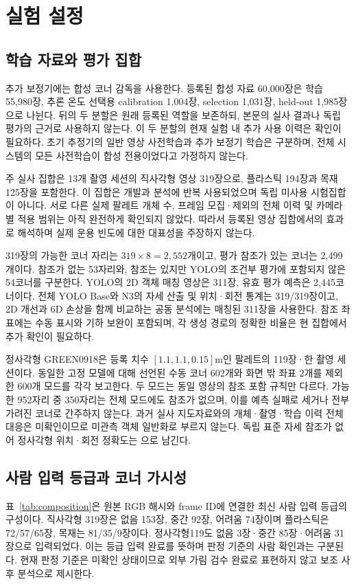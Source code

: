 \section{실험 설정}\label{sec:setup}
\subsection{학습 자료와 평가 집합}
추가 보정기에는 합성 코너 감독을 사용한다. 등록된 합성 자료 60,000장은 학습 55,980장, 추론 온도 선택용 calibration 1,004장, selection 1,031장, held-out 1,985장으로 나뉜다. 뒤의 두 분할은 원래 등록된 역할을 보존하되, 본문의 실사 결과나 독립 평가의 근거로 사용하지 않는다. 이 두 분할의 현재 실험 내 추가 사용 이력은 확인이 필요하다. 초기 추정기의 일반 영상 사전학습과 추가 보정기 학습은 구분하며, 전체 시스템의 모든 사전학습이 합성 전용이었다고 가정하지 않는다.

주 실사 집합은 13개 촬영 세션의 직사각형 영상 319장으로, 플라스틱 194장과 목재 125장을 포함한다. 이 집합은 개발과 분석에 반복 사용되었으며 독립 미사용 시험집합이 아니다. 서로 다른 실제 팔레트 개체 수, 프레임 모집·제외의 전체 이력 및 카메라별 적용 범위는 아직 완전하게 확인되지 않았다. 따라서 등록된 영상 집합에서의 효과로 해석하며 실제 운용 빈도에 대한 대표성을 주장하지 않는다.

319장의 가능한 코너 자리는 $319\times8=2,552$개이고, 평가 참조가 있는 코너는 2,499개이다. 참조가 없는 53자리와, 참조는 있지만 YOLO의 조건부 평가에 포함되지 않은 54코너를 구분한다. YOLO의 2D 객체 매칭 영상은 311장, 유효 평가 예측은 2,445코너이다. 전체 YOLO Base와 N3의 자세 산출 및 위치·회전 통계는 319/319장이고, 2D 개선과 6D 손상을 함께 비교하는 공동 분석에는 매칭된 311장을 사용한다. 참조 좌표에는 수동 표시와 기하 보완이 포함되며, 각 생성 경로의 정확한 비율은 현 집합에서 추가 확인이 필요하다.

정사각형 GREEN0918은 등록 치수 $[1.1,1.1,0.15]$m인 팔레트의 119장·한 촬영 세션이다. 동일한 고정 모델에 대해 선언된 수동 코너 602개와 화면 밖 좌표 2개를 제외한 600개 모드를 각각 보고한다. 두 모드는 동일 영상의 참조 포함 규칙만 다르다. 가능한 952자리 중 350자리는 전체 모드에도 참조가 없으며, 이를 예측 실패로 세거나 전부 가려진 코너로 간주하지 않는다. 과거 실사 지도자료와의 개체·촬영·학습 이력 전체 대응은 미확인이므로 미관측 객체 일반화로 부르지 않는다. 독립 표준 자세 참조가 없어 정사각형 위치·회전 정확도는 \notrun 으로 남긴다.



\subsection{사람 입력 등급과 코너 가시성}
표~\ref{tab:composition}은 원본 RGB 해시와 frame ID에 연결한 최신 사람 입력 등급의 구성이다. 직사각형 319장은 없음 153장, 중간 92장, 어려움 74장이며 플라스틱은 72/57/65장, 목재는 81/35/9장이다. 정사각형119도 없음 3장·중간 85장·어려움 31장으로 입력되었다. 이는 등급 입력 완료를 뜻하며 판정 기준의 사람 확인과는 구분된다. 현재 판정 기준은 미확인 상태이므로 외부 가림 검수 완료로 표현하지 않고 보조 사후 분석으로 제시한다.


